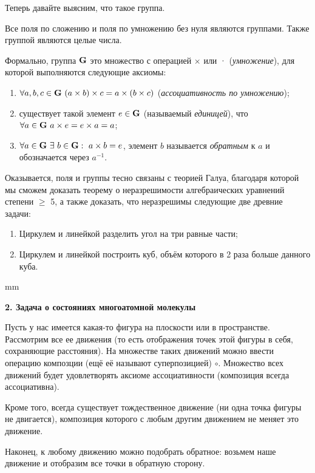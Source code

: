 \documentclass[12pt,english,russian]{article}
\begin{document}
	Теперь давайте выясним, что такое группа.

	Все поля по сложению и поля по умножению без нуля являются группами. Также группой являются целые числа.

	Формально, группа ${\bf G}$ это множество с операцией $\times$ или · (\textit{умножение}), 
	для которой выполняются следующие аксиомы:

	\begin{enumerate}
		\item $\forall a,b,c \in {\bf G} \ (a\times b)\times c = a\times(b\times c)$ (\textit{ассоциативность по умножению});
		\item существует такой элемент $e \in {\bf G}$ (называемый \textit{единицей}), что $\forall a \in {\bf G} \ a \times e = e \times a = a$;
		\item $\forall a \in {\bf G} \ \exists \ b \in {\bf G}: \ a \times b = e$, элемент $b$  называется \textit{обратным} к $a$ и обозначается через $a^{-1}$.
	\end{enumerate}

	Оказывается, поля и группы тесно связаны с теорией Галуа,
	благодаря которой мы сможем доказать теорему о неразрешимости 
	алгебраических уравнений степени $\geqslant$ 5, а также доказать,
	что неразрешимы следующие две древние задачи:

	\begin{enumerate}
		\item Циркулем и линейкой разделить угол на три равные части;
		\item Циркулем и линейкой построить куб, объём которого в 2 раза больше данного куба.
	\end{enumerate}
	 mm


	{\bf2. Задача о состояниях многоатомной молекулы}

	Пусть у нас имеется какая-то фигура на плоскости или в пространстве. 
	Рассмотрим все ее движения (то есть отображения
	точек этой фигуры в себя, сохраняющие расстояния). На множестве 
	таких движений можно ввести операцию композции (ещё
	её называют суперпозицией) $\circ$. Множество всех движений будет
	удовлетворять аксиоме ассоциативности (композиция всегда ассоциативна).

	Кроме того, всегда существует тождественное движение (ни
	одна точка фигуры не двигается), композиция которого с любым
	другим движением не меняет это движение.

	Наконец, к любому движению можно подобрать обратное: возьмем 
	наше движение и отобразим все точки в обратную сторону.
\end{document}
